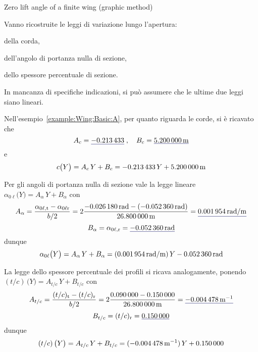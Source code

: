 \documentclass[[12pt,twoside]{book}
\begin{document}
\begin{myExampleX}{Zero lift angle of a finite wing (graphic method)}{\ \myIconGraph\ }
\medskip

Vanno ricostruite le leggi di variazione lungo l'apertura:%
\begin{inparaenum}
\item
della corda,
\item
dell'angolo di portanza nulla di sezione, 
\item
dello spessore percentuale di sezione.
\end{inparaenum}
In mancanza di specifiche indicazioni, si può assumere
che le ultime due leggi siano lineari.

Nell'esempio~\ref{example:Wing:Basic:A}, per quanto riguarda le corde, si è ricavato che
\[
A_c
  = \mathunderline{mydarkblue}{ \SI[round-precision=3]{\myCoeffAChordWing}{} }
\;,\quad
B_c
  = \mathunderline{mydarkblue}{ \SI[round-precision=2]{\myCoeffBChordWingMT}{\metre} }
\]
e
\[
c \big( Y \big) = A_c \, Y + B_c
  = \SI[round-precision=3]{\myCoeffAChordWing}{} \, Y
    + \SI[round-precision=2]{\myCoeffBChordWingMT}{\metre}
\]

Per gli angoli di portanza nulla di sezione vale la legge lineare
$\alpha_{0\ell} \big( Y \big) = A_{\alpha} \, Y + B_{\alpha}$ 
con
\[
A_{\alpha}
  = \frac{\alpha_{0\ell,\mathrm{t}} - \alpha_{0\ell\mathrm{r}}}{b/2}
  = 
    2 \frac{
      \SI[round-precision=4]{\myAlphaZeroLiftTipWingRAD}{\radian} 
        - ( \SI[round-precision=4]{\myAlphaZeroLiftRootWingRAD}{\radian} )
    }{
      \SI[round-precision=2]{\mySpanWingMT}{\metre}
    }
  = \mathunderline{mydarkblue}{ \SI[round-precision=5]{\myCoeffAAeroTwistWingRADMT}{\radian/\metre} }
\]
\[
B_{\alpha}
  = \alpha_{0\ell,\mathrm{r}}
  = \mathunderline{mydarkblue}{ \SI[round-precision=4]{\myAlphaZeroLiftRootWingRAD}{\radian} }
\]
dunque
\[
\alpha_{0\ell} \big( Y \big) = A_{\alpha} \, Y + B_{\alpha}
  = (\SI[round-precision=5]{\myCoeffAAeroTwistWingRADMT}{\radian/\metre}) \, Y
    \SI[round-precision=4]{\myAlphaZeroLiftRootWingRAD}{\radian}
\]

La legge dello spessore percentuale dei profili si ricava analogamente,
ponendo
$(t/c)\,\big( Y \big) = A_{t/c} \, Y + B_{t/c}$ 
con
\[
A_{t/c}
  = \frac{(t/c)_{\mathrm{t}} - (t/c)_{\mathrm{r}}}{b/2}
  = 
    2 \frac{
      \SI[round-precision=2]{\myThicknessOverChordTipWing}{} 
        - \SI[round-precision=4]{\myThicknessOverChordRootWing}{}
    }{
      \SI[round-precision=2]{\mySpanWingMT}{\metre}
    }
  = \mathunderline{mydarkblue}{ \SI[round-precision=5]{\myCoeffAPercThicknessWingMT}{\metre^{-1}} }
\]
\[
B_{t/c}
  = (t/c)_{\mathrm{r}}
  = \mathunderline{mydarkblue}{ \SI[round-precision=2]{\myCoeffBPercThicknessWing}{} }
\]
dunque
\[
(t/c)\,\big( Y \big) = A_{t/c} \, Y + B_{t/c}
  = (\SI[round-precision=5]{\myCoeffAPercThicknessWingMT}{\metre^{-1}}) \, Y
    + \SI[round-precision=2]{\myCoeffBPercThicknessWing}{}
\]


\end{myExampleX}
\end{document}
